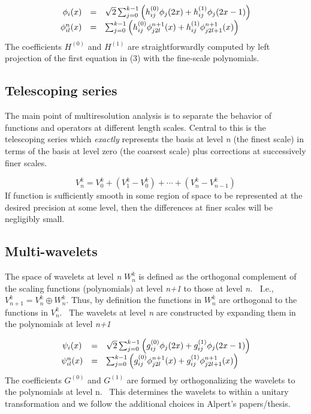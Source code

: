 \documentclass[letterpaper]{book}
\begin{document}
\begin{equation}\label{seq:refText2}
\begin{matrix}\hfill \phi _{i}(x)&\text{=}&\sqrt{2}\sum _{j=0}^{k-1}\left(h_{ij}^{(0)}\phi _{j}(2x)+h_{ij}^{(1)}\phi
_{j}(2x-1)\right)\\\phi _{il}^{n}(x)&\text{=}&\sum _{j=0}^{k-1}\left(h_{ij}^{(0)}\phi _{j2l}^{n+1}(x)+h_{ij}^{(1)}\phi
_{j2l+1}^{n+1}(x)\right)\hfill\null \end{matrix}
\end{equation}
The coefficients  $H^{(0)}$ and  $H^{(1)}$ are straightforwardly computed by left projection of the first equation in
(3) with the fine-scale polynomials.

\subsection[Telescoping series]{Telescoping series}
The main point of multiresolution analysis is to separate the behavior of functions and operators at different length
scales. Central to this is the telescoping series which \textit{exactly }represents the basis at level \textit{n }(the
finest scale) in terms of the basis at level zero (the coarsest scale) plus corrections at successively finer scales.

\begin{equation}\label{seq:refText3}
V_{n}^{k}=V_{0}^{k}+\left(V_{1}^{k}-V_{0}^{k}\right)+\cdots +\left(V_{n}^{k}-V_{n-1}^{k}\right)
\end{equation}
If function is sufficiently smooth in some region of space to be represented at the desired precision at some level,
then the differences at finer scales will be negligibly small.

\subsection{Multi-wavelets}
The space of wavelets at level \textit{n } $W_{n}^{k}$ is defined as the orthogonal complement of the scaling functions
(polynomials) at level \textit{n+1} to those at level \textit{n. \ }I.e., $V_{n+1}^{k}=V_{n}^{k}\oplus W_{n}^{k}$.
Thus, by definition the functions in  $W_{n}^{k}$ are orthogonal to the functions in  $V_{n}^{k}$. \ The wavelets at
level \textit{n }are constructed by expanding them in the polynomials at level \textit{n+1}

\begin{equation}\label{seq:refText4}
\begin{matrix}\psi _{i}(x)&\text{=}&\sqrt{2}\sum _{j=0}^{k-1}\left(g_{ij}^{(0)}\phi _{j}(2x)+g_{ij}^{(1)}\phi
_{j}(2x-1)\right)\\\psi _{il}^{n}(x)&\text{=}&\sum _{j=0}^{k-1}\left(g_{ij}^{(0)}\phi _{j2l}^{n+1}(x)+g_{ij}^{(1)}\phi
_{j2l+1}^{n+1}(x)\right)\hfill\null \end{matrix}
\end{equation}
The coefficients  $G^{(0)}$ and  $G^{(1)}$ are formed by orthogonalizing the wavelets to the polynomials at level n.
\ This determines the wavelets to within a unitary transformation and we follow the additional choices in Alpert's
papers/thesis.
\end{document}
